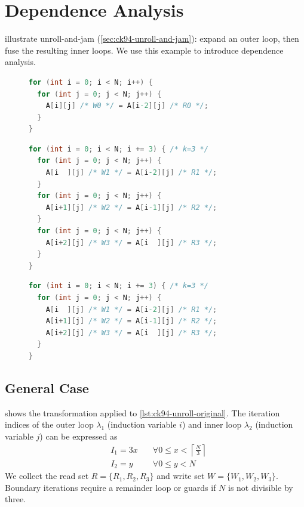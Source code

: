 \section{Dependence Analysis}
\label{sec:ck94-dependence-analysis}
illustrate unroll-and-jam (\cref{sec:ck94-unroll-and-jam}): expand an outer
loop, then fuse the resulting inner loops. We use this example to introduce
dependence analysis.
\begin{figure}[H]
  \centering
  \begin{minipage}[t]{0.30\textwidth}
\begin{lstlisting}[language=C, basicstyle=\ttfamily\scriptsize,
  caption={Original},
  label={lst:ck94-unroll-original}]
for (int i = 0; i < N; i++) {
  for (int j = 0; j < N; j++) {
    A[i][j] /* W0 */ = A[i-2][j] /* R0 */;
  }
}
\end{lstlisting}
  \end{minipage}%
  \hfill
  \begin{minipage}[t]{0.35\textwidth}
\begin{lstlisting}[language=C, basicstyle=\ttfamily\scriptsize,
  caption={Unrolled},
  label={lst:ck94-unroll-expanded}]
for (int i = 0; i < N; i += 3) { /* k=3 */
  for (int j = 0; j < N; j++) {
    A[i  ][j] /* W1 */ = A[i-2][j] /* R1 */;
  }
  for (int j = 0; j < N; j++) {
    A[i+1][j] /* W2 */ = A[i-1][j] /* R2 */;
  }
  for (int j = 0; j < N; j++) {
    A[i+2][j] /* W3 */ = A[i  ][j] /* R3 */;
  }
}
\end{lstlisting}
  \end{minipage}%
  \hfill
  \begin{minipage}[t]{0.31\textwidth}
\begin{lstlisting}[language=C, basicstyle=\ttfamily\scriptsize,
  caption={Unroll-and-Jam ($k = 3$)},
  label={lst:ck94-unroll-jammed}]
for (int i = 0; i < N; i += 3) { /* k=3 */
  for (int j = 0; j < N; j++) {
    A[i  ][j] /* W1 */ = A[i-2][j] /* R1 */;
    A[i+1][j] /* W2 */ = A[i-1][j] /* R2 */;
    A[i+2][j] /* W3 */ = A[i  ][j] /* R3 */;
  }
}
\end{lstlisting}
  \end{minipage}
\end{figure}

\subsection{General Case}
 shows the transformation applied to
\cref{lst:ck94-unroll-original}. The iteration indices of the outer
loop $\lambda_1$ (induction variable $i$) and inner loop $\lambda_2$
(induction variable $j$) can be expressed as
\[
\begin{aligned}
&I_{1} = 3x &\quad \forall 0 \le x < \left\lceil \frac{N}{3} \right\rceil \\
&I_{2} = y &\quad \forall 0 \le y < N
\end{aligned}
\]
We collect the read set $R=\{R_{1},R_{2},R_{3}\}$ and write set
$W=\{W_{1},W_{2},W_{3}\}$. Boundary iterations require a remainder loop
or guards if $N$ is not divisible by three.

